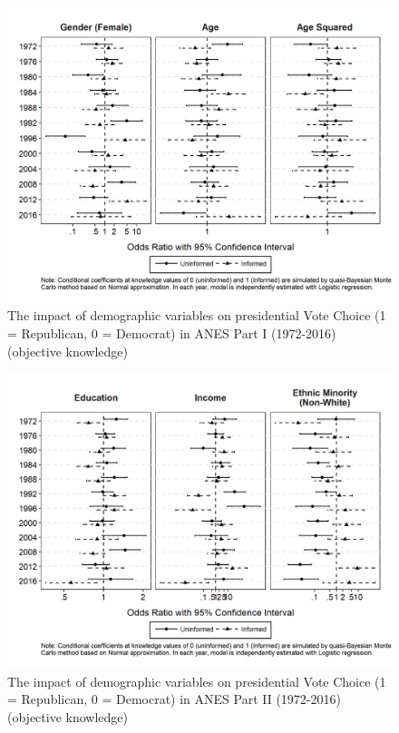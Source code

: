 \begin{figure}[ht!!!]
    \caption{The impact of demographic variables on presidential Vote Choice (1 = Republican, 0 = Democrat) in ANES Part I (1972-2016) (objective knowledge)}
    \label{fig:v2anescoefplot_dem1}
    \includegraphics[width=\linewidth]{../outputs/m2sq_anescoefplot_dem1.png}
\end{figure}

\begin{figure}[ht!!!]
    \caption{The impact of demographic variables on presidential Vote Choice (1 = Republican, 0 = Democrat) in ANES Part II (1972-2016) (objective knowledge)}
    \label{fig:v2anescoefplot_dem2}
    \includegraphics[width=\linewidth]{../outputs/m2sq_anescoefplot_dem2.png}
\end{figure}


